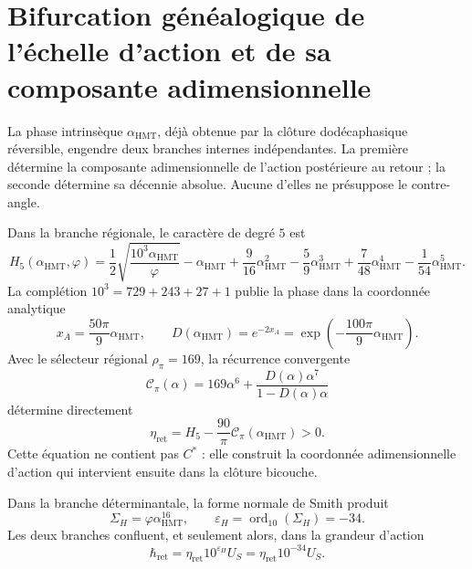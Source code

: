 
\section{Bifurcation généalogique de l'échelle d'action et de sa composante adimensionnelle}
\label{sec:sucesor-102-c14-bifurcacion-accion}

La phase intrinsèque \(\alpha_{\mathrm{HMT}}\), déjà obtenue par la
clôture dodécaphasique réversible, engendre deux branches internes indépendantes.
La première détermine la composante adimensionnelle de l'action postérieure au
retour ; la seconde détermine sa décennie absolue. Aucune d'elles ne présuppose
le contre-angle.

Dans la branche régionale, le caractère de degré \(5\) est
\begin{equation}
 H_5(\alpha_{\mathrm{HMT}},\varphi)
 =\frac12\sqrt{\frac{10^3\alpha_{\mathrm{HMT}}}{\varphi}}
  -\alpha_{\mathrm{HMT}}
  +\frac9{16}\alpha_{\mathrm{HMT}}^2
  -\frac59\alpha_{\mathrm{HMT}}^3
  +\frac7{48}\alpha_{\mathrm{HMT}}^4
  -\frac1{54}\alpha_{\mathrm{HMT}}^5 .
 \label{eq:sucesor-102-c14-h5-preangular}
\end{equation}
La complétion \(10^3=729+243+27+1\) publie la phase dans la coordonnée
analytique
\begin{equation}
 x_A=\frac{50\pi}{9}\alpha_{\mathrm{HMT}},
 \qquad
 D(\alpha_{\mathrm{HMT}})=e^{-2x_A}
 =\exp\!\left(-\frac{100\pi}{9}\alpha_{\mathrm{HMT}}\right).
 \label{eq:sucesor-102-c14-determinante-regional}
\end{equation}
Avec le sélecteur régional \(\rho_\pi=169\), la récurrence convergente
\begin{equation}
 \mathscr C_\pi(\alpha)
 =169\alpha^6+
   \frac{D(\alpha)\alpha^7}{1-D(\alpha)\alpha}
 \label{eq:sucesor-102-c14-recurrencia-regional}
\end{equation}
détermine directement
\begin{equation}
 \boxed{\eta_{\mathrm{ret}}
 =H_5-\frac{90}{\pi}\mathscr C_\pi(\alpha_{\mathrm{HMT}})>0.}
 \label{eq:sucesor-102-c14-eta-directa}
\end{equation}
Cette équation ne contient pas \(C^*\) : elle construit la coordonnée adimensionnelle
d'action qui intervient ensuite dans la clôture bicouche.

Dans la branche déterminantale, la forme normale de Smith produit
\begin{equation}
 \Sigma_H=\varphi\alpha_{\mathrm{HMT}}^{16},
 \qquad
 \varepsilon_H=\operatorname{ord}_{10}(\Sigma_H)=-34.
 \label{eq:sucesor-102-c14-decada-accion}
\end{equation}
Les deux branches confluent, et seulement alors, dans la grandeur d'action
\begin{equation}
 \boxed{\hbar_{\mathrm{ret}}
 =\eta_{\mathrm{ret}}10^{\varepsilon_H}U_S
 =\eta_{\mathrm{ret}}10^{-34}U_S.}
 \label{eq:sucesor-102-c14-hbar-tipado}
\end{equation}

